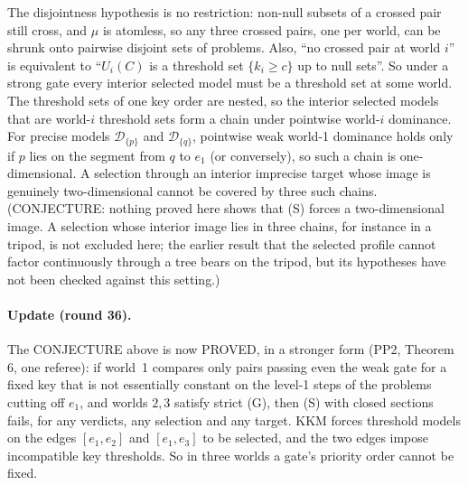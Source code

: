\documentclass[11pt]{article}
\theoremstyle{definition}\newtheorem{definition}[theorem]{Definition}
\theoremstyle{remark}\newtheorem{remark}[theorem]{Remark}
\newcommand{\Dscr}{\mathcal D}
\begin{document}
The disjointness hypothesis is no restriction: non-null subsets of a crossed
pair still cross, and $\mu$ is atomless, so any three crossed pairs, one per
world, can be shrunk onto pairwise disjoint sets of problems. Also, ``no
crossed pair at world $i$'' is equivalent to ``$U_i(C)$ is a threshold set
$\{k_i\ge c\}$ up to null sets''. So under a strong gate every interior selected
model must be a threshold set at some world. The threshold sets of one key
order are nested, so the interior selected models that are world-$i$ threshold
sets form a chain under pointwise world-$i$ dominance. For precise models
$\Dscr_{\{p\}}$ and $\Dscr_{\{q\}}$, pointwise weak world-1 dominance holds
only if $p$ lies on the segment from $q$ to $e_1$ (or conversely), so such a
chain is one-dimensional. A selection through an interior imprecise target
whose image is genuinely two-dimensional cannot be covered by three such
chains. (CONJECTURE: nothing proved here shows that (S) forces a
two-dimensional image. A selection whose interior image lies in three chains,
for instance in a tripod, is not excluded here; the earlier result that the
selected profile cannot factor continuously through a tree bears on the tripod,
but its hypotheses have not been checked against this setting.)

\paragraph{Update (round 36).} The CONJECTURE above is now PROVED, in a
stronger form (PP2, Theorem 6, one referee): if world~1 compares only pairs
passing even the weak gate for a fixed key that is not essentially constant on
the level-1 steps of the problems cutting off $e_1$, and worlds $2,3$ satisfy
strict (G), then (S) with closed sections fails, for any verdicts, any
selection and any target. KKM forces threshold models on the edges $[e_1,e_2]$
and $[e_1,e_3]$ to be selected, and the two edges impose incompatible key
thresholds. So in three worlds a gate's priority order cannot be fixed.
\end{document}
